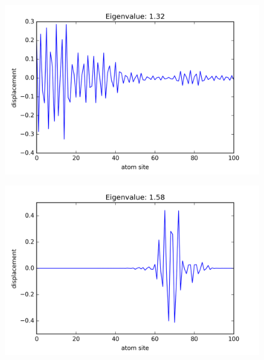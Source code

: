 \begin{figure}[!htbh]
\centering
\begin{minipage}{.45\textwidth}
  \centering
  \includegraphics[width=1.1\linewidth]{Harmonic_mass_ratio/normal_Prob_0_1N_103m_2p_76th.png}
  \label{fig:mass prob 0.1 76th}
\end{minipage}\qquad
\begin{minipage}{.45\textwidth}
  \centering
  \includegraphics[width=1.1\linewidth]{Harmonic_mass_ratio/normal_Prob_0_5N_103m_2p_76th.png}
  \label{fig:mass prob 0.5 76th}
\end{minipage}
\end{figure}

